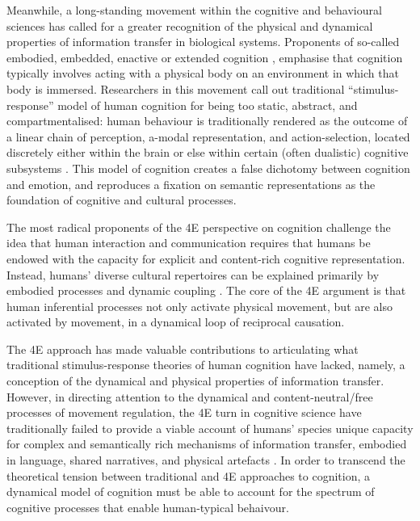\begin{CJK}{UTF8}{gbsn}
Meanwhile, a long-standing movement within the cognitive and behavioural sciences has called for a greater recognition of the physical and dynamical properties of information transfer in biological systems.  Proponents of so-called embodied, embedded, enactive or extended cognition \citep[now collectively referred to as ``4E cognition,'' see][]{Menary2010}, emphasise that cognition typically involves acting with a physical body on an environment in which that body is immersed.  Researchers in this movement call out traditional ``stimulus-response'' model of human cognition for being too static, abstract, and compartmentalised: human behaviour is traditionally rendered as the outcome of a linear chain of perception, a-modal representation, and action-selection, located discretely either within the brain or else within certain (often dualistic) cognitive subsystems \citep[e.g., emotional and cognitive, System 1 (fast) and System 2 (slow), implicit and explicit, and so on; cf.][]{Diennes1999,Kahneman2011}.  This model of cognition creates a false dichotomy between cognition and emotion, and reproduces a fixation on semantic representations as the foundation of cognitive and cultural processes.

The most radical proponents of the 4E perspective on cognition challenge the idea that human interaction and communication requires that humans be endowed with the capacity for explicit and content-rich cognitive representation.  Instead, humans' diverse cultural repertoires can be explained primarily by embodied processes and dynamic coupling \citep{Gallagher2001,Gallagher2008,Fuchs2009}.  The core of the 4E argument is that human inferential processes not only activate physical movement, but are also activated by movement, in a dynamical loop of reciprocal causation.

The 4E approach has made valuable contributions to articulating what traditional stimulus-response theories of human cognition have lacked, namely, a conception of the dynamical and physical properties of information transfer.  However, in directing attention to the dynamical and content-neutral/free processes of movement regulation, the 4E turn in cognitive science have traditionally failed to provide a viable account of humans' species unique capacity for complex and semantically rich mechanisms of information transfer, embodied in language, shared narratives, and physical artefacts \citep{Ramstead2016}.  In order to transcend the theoretical tension between traditional and 4E approaches to cognition, a dynamical model of cognition must be able to account for the spectrum of cognitive processes that enable human-typical behaivour.


\end{CJK}
